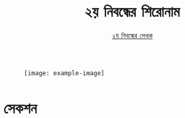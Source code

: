 \documentclass[12pt]{article}
\begin{document}
\begin{figure}[t]
        \centering 
        \texttt{[image: example-image]}
\end{figure}

\title{২য় নিবন্ধের শিরোনাম}
\author{\href{https://github.com/rafisics/ebook-template}{২য় নিবন্ধের লেখক}}
\date{}


\section{সেকশন}

\lipsum[2]

\Blindtext 

\end{document}
